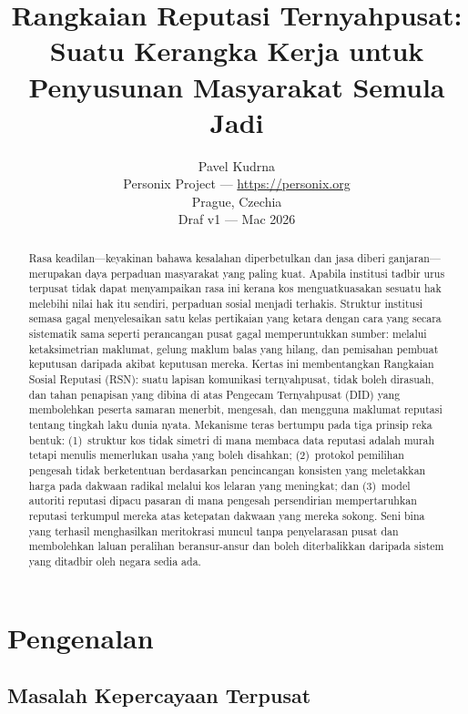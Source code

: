 \documentclass[11pt,a4paper,twocolumn]{article}
\title{\textbf{Rangkaian Reputasi Ternyahpusat:\\Suatu Kerangka Kerja untuk Penyusunan Masyarakat Semula Jadi}}
\author{Pavel Kudrna\\Personix Project --- \url{https://personix.org}\\Prague, Czechia\\Draf v1 --- Mac 2026}
\date{}
\begin{document}
\maketitle

\begin{abstract}
Rasa keadilan---keyakinan bahawa kesalahan diperbetulkan dan jasa diberi ganjaran---merupakan daya perpaduan masyarakat yang paling kuat. Apabila institusi tadbir urus terpusat tidak dapat menyampaikan rasa ini kerana kos menguatkuasakan sesuatu hak melebihi nilai hak itu sendiri, perpaduan sosial menjadi terhakis. Struktur institusi semasa gagal menyelesaikan satu kelas pertikaian yang ketara dengan cara yang secara sistematik sama seperti perancangan pusat gagal memperuntukkan sumber: melalui ketaksimetrian maklumat, gelung maklum balas yang hilang, dan pemisahan pembuat keputusan daripada akibat keputusan mereka. Kertas ini membentangkan Rangkaian Sosial Reputasi (RSN): suatu lapisan komunikasi ternyahpusat, tidak boleh dirasuah, dan tahan penapisan yang dibina di atas Pengecam Ternyahpusat (DID) yang membolehkan peserta samaran menerbit, mengesah, dan mengguna maklumat reputasi tentang tingkah laku dunia nyata. Mekanisme teras bertumpu pada tiga prinsip reka bentuk: (1)~struktur kos tidak simetri di mana membaca data reputasi adalah murah tetapi menulis memerlukan usaha yang boleh disahkan; (2)~protokol pemilihan pengesah tidak berketentuan berdasarkan pencincangan konsisten yang meletakkan harga pada dakwaan radikal melalui kos lelaran yang meningkat; dan (3)~model autoriti reputasi dipacu pasaran di mana pengesah persendirian mempertaruhkan reputasi terkumpul mereka atas ketepatan dakwaan yang mereka sokong. Seni bina yang terhasil menghasilkan meritokrasi muncul tanpa penyelarasan pusat dan membolehkan laluan peralihan beransur-ansur dan boleh diterbalikkan daripada sistem yang ditadbir oleh negara sedia ada.
\end{abstract}

\section{Pengenalan}

\subsection{Masalah Kepercayaan Terpusat}
\end{document}
